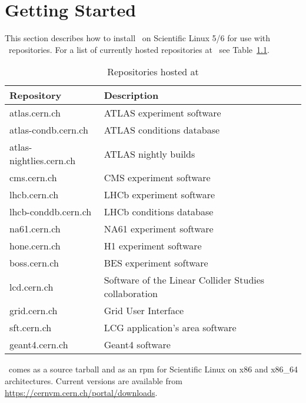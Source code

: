 \chapter{Getting Started}
\label{sct:start}

This section describes how to install \cvmfs\ on Scientific Linux 5/6 for use with \cernvm\ repositories.
For a list of currently hosted repositories at \cern\ see Table~\ref{tbl:repos}.
\begin{table}[t]
	\begin{center}
		\begin{tabular}{l|l}
			\bf Repository & \bf Description \\\hline
			atlas.cern.ch & ATLAS experiment software \\
			atlas-condb.cern.ch & ATLAS conditions database \\
			atlas-nightlies.cern.ch & ATLAS nightly builds \\
			cms.cern.ch & CMS experiment software \\
			lhcb.cern.ch & LHCb experiment software \\
			lhcb-conddb.cern.ch & LHCb conditions database \\
			na61.cern.ch & NA61 experiment software \\
			hone.cern.ch & H1 experiment software \\
			boss.cern.ch & BES experiment software \\
			lcd.cern.ch & Software of the Linear Collider Studies collaboration \\
			grid.cern.ch & Grid User Interface \\
			sft.cern.ch & LCG application's area software \\
			geant4.cern.ch & Geant4 software \\ 
		\end{tabular}
	\end{center}
	\caption{Repositories hosted at \cern}
	\label{tbl:repos}
\end{table}
\cvmfs\ comes as a source tarball and as an rpm for Scientific Linux on x86 and x86\_64 architectures.
Current versions are available from \url{https://cernvm.cern.ch/portal/downloads}.

